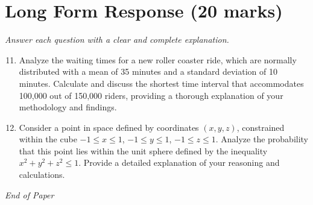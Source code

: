\documentclass[12pt]{article}
\begin{document}
\section*{Long Form Response (20 marks)}
\textit{Answer each question with a clear and complete explanation.}
\begin{enumerate}[label=\arabic*.]
\setcounter{enumi}{10}
\item Analyze the waiting times for a new roller coaster ride, which are normally distributed with a mean of 35 minutes and a standard deviation of 10 minutes. Calculate and discuss the shortest time interval that accommodates 100,000 out of 150,000 riders, providing a thorough explanation of your methodology and findings.
\item Consider a point in space defined by coordinates $(x,y,z)$, constrained within the cube $-1 \leq x \leq 1$, $-1 \leq y \leq 1$, $-1 \leq z \leq 1$. Analyze the probability that this point lies within the unit sphere defined by the inequality $x^2 + y^2 + z^2 \leq 1$. Provide a detailed explanation of your reasoning and calculations.
\end{enumerate}

\vfill
\noindent\textit{End of Paper}
\end{document}

